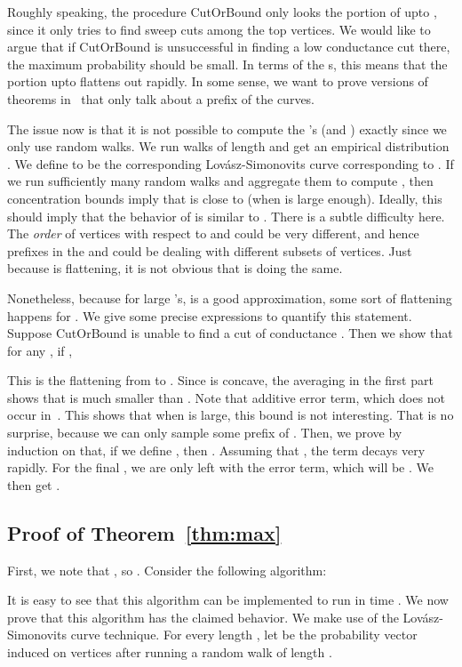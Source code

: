 \documentclass[11pt]{article}
\newcommand\CutOrBound{{\sc CutOrBound}\xspace}
\begin{document}
Roughly speaking, the procedure {\CutOrBound} only looks the portion
of  upto , since it only tries to find sweep cuts among the
top  vertices. We would like to argue that if {\CutOrBound}
is unsuccessful in finding a low conductance cut there, the
maximum probability should be small. In terms of the s,
this means that the portion upto  flattens out rapidly.
In some sense, we want to prove versions of theorems
in~\cite{LS90} that only talk about a prefix of the
 curves.

The issue now is that it is not possible to compute the 's (and )
exactly since we only use random walks. We run walks
of length  and get an empirical distribution
. We define  to be the
corresponding Lov\'{a}sz-Simonovits curve corresponding to
. If we run sufficiently many random walks and aggregate them to compute , then concentration bounds imply that  is close
to  (when  is large enough). Ideally, this should imply
that the behavior of  is similar to .
There is a subtle difficulty here. The \emph{order}
of vertices with respect to  and  could
be very different, and hence prefixes in the  and
 could be dealing with different subsets
of vertices. Just because  is flattening, it is
not obvious that  is doing the same.

Nonetheless, because for large 's,
 is a good approximation, some sort
of flattening happens for . We give some
precise expressions to quantify this statement. Suppose
{\CutOrBound} is unable to find a cut of conductance .
Then we show that for any , if ,

This is the flattening from  to . Since  is concave, the
averaging in the first part shows that  is much smaller than
. Note that additive error term, which does not occur
in~\cite{LS90}. This shows that when  is large, this bound is not
interesting. That is no surprise, because we can only sample some prefix of
. Then, we prove by induction on  that, if we define , then
.
Assuming that ,  the  term decays very
rapidly. For the final , we are only left with the error term, which will be . We then get
.


\subsection{Proof of Theorem~\ref{thm:max}} \label{sec:ls}

First, we note that , so . Consider the following algorithm:


It is easy to see that this algorithm can be implemented to run in time . We now prove that this algorithm has the claimed behavior. We make use of the Lov\'{a}sz-Simonovits curve technique. For every length , let  be the probability vector induced on vertices after running a random walk of length .
\end{document}
